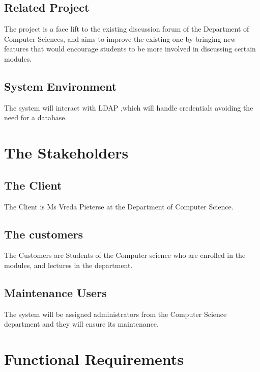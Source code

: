 \documentclass[11pt]{article}
\begin{document}
\subsection{Related Project}
The project is a face lift to the existing discussion forum of the Department of Computer Sciences, and aims to improve the existing one by bringing new features that would encourage students to be more involved in discussing certain modules.
\subsection{System Environment}
The system will interact with LDAP ,which will handle credentials avoiding the need for a database.

\section{The Stakeholders}

\subsection{The Client}
The Client is Ms Vreda Pieterse at the Department of Computer Science.
\subsection{The customers}
The Customers are Students of the Computer science who are enrolled in the modules, and lectures in the department.
\subsection{Maintenance Users}
The system will be assigned administrators from the Computer Science department and they will ensure its maintenance.

\newpage
\section{Functional Requirements}
\end{document}
